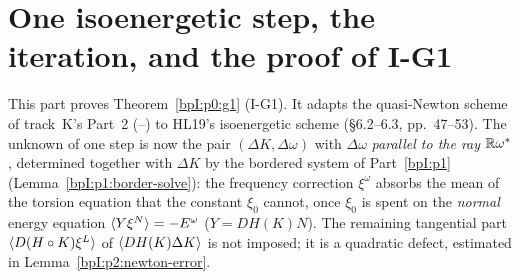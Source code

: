 \sloppy
\section{One isoenergetic step, the iteration, and the proof of I-G1}\label{bpI:p2}

This part proves Theorem~\ref{bpI:p0:g1} (I-G1). It adapts the quasi-Newton scheme of track~K's Part~2
(--) to HL19's isoenergetic scheme (\S6.2--6.3, pp.~47--53). The
unknown of one step is now the pair $(\Delta K,\Delta\omega)$ with $\Delta\omega$ \emph{parallel to the ray}
$\mathbb{R}\omega^*$, determined together with $\Delta K$ by the bordered system of Part~\ref{bpI:p1}
(Lemma~\ref{bpI:p1:border-solve}): the frequency correction $\xi^\omega$ absorbs the mean of the torsion equation that the
constant $\xi_0$ cannot, once $\xi_0$ is spent on the \emph{normal} energy equation $\langle Y\xi^N\rangle=-E^\omega$ ($Y=DH(K)N$). The remaining tangential part $\langle D(H\circ K)\xi^L\rangle$ of $\langle DH(K)\Delta K\rangle$ is not imposed; it is a quadratic defect, estimated in Lemma~\ref{bpI:p2:newton-error}.

